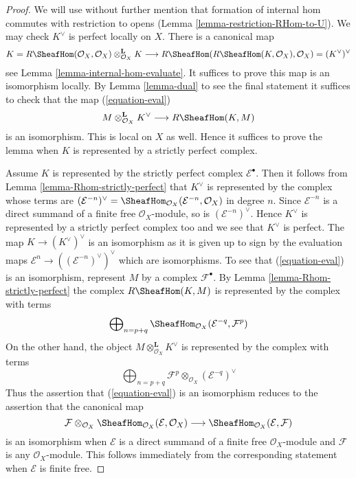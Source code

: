 \begin{proof}
We will use without further mention that formation of internal hom commutes
with restriction to opens (Lemma \ref{lemma-restriction-RHom-to-U}).
We may check $K^\vee$ is perfect locally on $X$. There is a canonical
map
$$
K = R\SheafHom(\mathcal{O}_X, \mathcal{O}_X)
\otimes_{\mathcal{O}_X}^\mathbf{L} K \longrightarrow
R\SheafHom(R\SheafHom(K, \mathcal{O}_X), \mathcal{O}_X) =
(K^\vee)^\vee
$$
see Lemma \ref{lemma-internal-hom-evaluate}. It suffices to prove
this map is an isomorphism locally. By Lemma \ref{lemma-dual}
to see the final statement it suffices to check that the map
(\ref{equation-eval})
$$
M \otimes^\mathbf{L}_{\mathcal{O}_X} K^\vee
\longrightarrow
R\SheafHom(K, M)
$$
is an isomorphism. This is local on $X$ as well.
Hence it suffices to prove the lemma when $K$ is represented
by a strictly perfect complex.

\medskip\noindent
Assume $K$ is represented by the strictly perfect complex
$\mathcal{E}^\bullet$. Then it follows from
Lemma \ref{lemma-Rhom-strictly-perfect}
that $K^\vee$ is represented by the complex whose terms are
$(\mathcal{E}^{-n})^\vee =
\SheafHom_{\mathcal{O}_X}(\mathcal{E}^{-n}, \mathcal{O}_X)$
in degree $n$. Since $\mathcal{E}^{-n}$ is a direct summand of a finite
free $\mathcal{O}_X$-module, so is $(\mathcal{E}^{-n})^\vee$.
Hence $K^\vee$ is represented by a strictly perfect complex too
and we see that $K^\vee$ is perfect.
The map $K \to (K^\vee)^\vee$ is an isomorphism as it is given
up to sign by the evaluation maps
$\mathcal{E}^n \to ((\mathcal{E}^{-n})^\vee)^\vee$
which are isomorphisms.
To see that (\ref{equation-eval}) is an isomorphism, represent
$M$ by a complex $\mathcal{F}^\bullet$.
By Lemma \ref{lemma-Rhom-strictly-perfect} the complex
$R\SheafHom(K, M)$ is represented by the complex with terms
$$
\bigoplus\nolimits_{n = p + q}
\SheafHom_{\mathcal{O}_X}(\mathcal{E}^{-q}, \mathcal{F}^p)
$$
On the other hand, the object $M \otimes^\mathbf{L}_{\mathcal{O}_X} K^\vee$
is represented by the complex with terms
$$
\bigoplus\nolimits_{n = p + q}
\mathcal{F}^p \otimes_{\mathcal{O}_X} (\mathcal{E}^{-q})^\vee
$$
Thus the assertion that (\ref{equation-eval}) is an isomorphism
reduces to the assertion that the canonical map
$$
\mathcal{F}
\otimes_{\mathcal{O}_X}
\SheafHom_{\mathcal{O}_X}(\mathcal{E}, \mathcal{O}_X)
\longrightarrow
\SheafHom_{\mathcal{O}_X}(\mathcal{E}, \mathcal{F})
$$
is an isomorphism when $\mathcal{E}$ is a direct summand of a finite
free $\mathcal{O}_X$-module and $\mathcal{F}$ is any $\mathcal{O}_X$-module.
This follows immediately from the corresponding statement when
$\mathcal{E}$ is finite free.
\end{proof}


